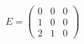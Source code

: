 \documentclass[preview]{standalone}
\begin{document}
\begin{align*}
E = \begin{pmatrix} 0 & 0 & 0 \\ 1 & 0 & 0 \\ 2 & 1 & 0 \end{pmatrix}
\end{align*}
\end{document}
